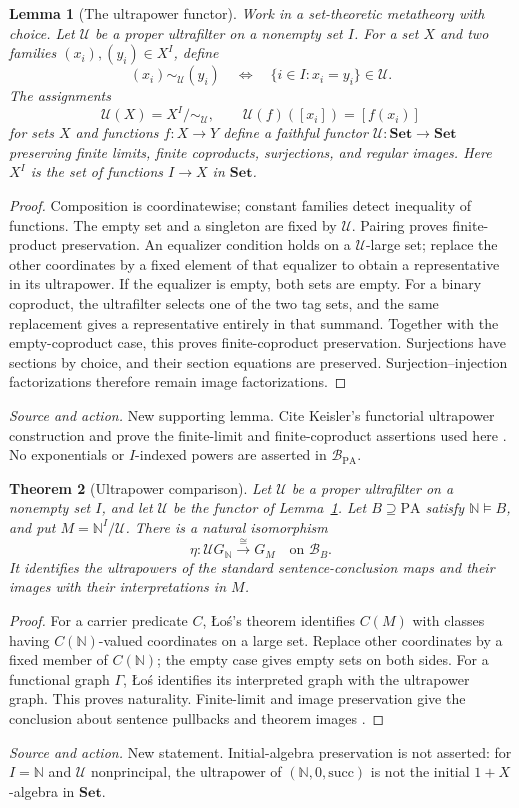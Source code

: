 \documentclass[11pt]{article}
\newtheorem{theorem}{Theorem}[section]
\newtheorem{lemma}[theorem]{Lemma}
\theoremstyle{definition}\newtheorem{definition}[theorem]{Definition}
\newcommand{\PA}{\mathrm{PA}}
\newcommand{\N}{\mathbb N}
\newcommand{\Set}{\mathbf{Set}}
\newcommand{\B}{\mathcal B}
\newcommand{\U}{\mathcal U}
\newcommand{\source}[1]{\par\smallskip\noindent\textit{Source and action.} #1\par\smallskip}
\begin{document}
\begin{lemma}[The ultrapower functor]\label{lem:ultrafunctor}
Work in a set-theoretic metatheory with choice. Let $\U$ be a proper
ultrafilter on a nonempty set $I$. For a set $X$ and two families
$(x_i),(y_i)\in X^I$, define
\[
 (x_i)\sim_{\U}(y_i)
 \quad\Longleftrightarrow\quad
 \{i\in I:x_i=y_i\}\in\U.
\]
The assignments
\[
 \mathscr U(X)=X^I/{\sim_{\U}},\qquad
 \mathscr U(f)([x_i])=[f(x_i)]
\]
for sets $X$ and functions $f:X\to Y$ define a faithful functor
$\mathscr U:\Set\to\Set$ preserving
finite limits, finite coproducts, surjections, and regular images.
Here $X^I$ is the set of functions $I\to X$ in $\Set$.
\end{lemma}
\begin{proof}
Composition is coordinatewise; constant families detect inequality
of functions. The empty set and a singleton are fixed by $\mathscr U$.
Pairing proves finite-product preservation. An
equalizer condition holds on a $\U$-large set; replace the other
coordinates by a fixed element of that equalizer to obtain a
representative in its ultrapower. If the equalizer is empty, both
sets are empty. For a binary coproduct, the ultrafilter selects one
of the two tag sets, and the same replacement gives a representative
entirely in that summand. Together with the empty-coproduct case,
this proves finite-coproduct preservation.
Surjections have sections by choice, and their
section equations are preserved. Surjection--injection factorizations
therefore remain image factorizations.
\end{proof}
\source{New supporting lemma. Cite Keisler's functorial ultrapower construction and prove the finite-limit and finite-coproduct assertions used here \cite[Theorem 3.1 and Proposition 4.2]{Keisler}. No exponentials or $I$-indexed powers are asserted in $\B_{\PA}$.}

\begin{theorem}[Ultrapower comparison]\label{thm:ultra}
Let $\U$ be a proper ultrafilter on a nonempty set $I$, and let
$\mathscr U$ be the functor of Lemma~\ref{lem:ultrafunctor}.
Let $B\supseteq\PA$ satisfy $\N\models B$, and put
$M=\N^I/\U$. There is a natural isomorphism
\[
 \eta:\mathscr U G_{\N}\xrightarrow{\cong}G_M
 \quad\text{on }\B_B.
\]
It identifies the ultrapowers of the standard sentence-conclusion
maps and their images with their interpretations in $M$.
\end{theorem}
\begin{proof}
For a carrier predicate $C$, \L{}o\'s's theorem identifies
$C(M)$ with classes having $C(\N)$-valued coordinates on a large
set. Replace other coordinates by a fixed member of $C(\N)$;
the empty case gives empty sets on both sides. For a functional
graph $\Gamma$, \L{}o\'s identifies its interpreted graph with the
ultrapower graph. This proves naturality. Finite-limit and image
preservation give the conclusion about sentence pullbacks and
theorem images \cite{Keisler}.
\end{proof}
\source{New statement. Initial-algebra preservation is not asserted: for $I=\N$ and $\U$ nonprincipal, the ultrapower of $(\N,0,\mathrm{succ})$ is not the initial $1+X$-algebra in $\Set$.}
\end{document}
